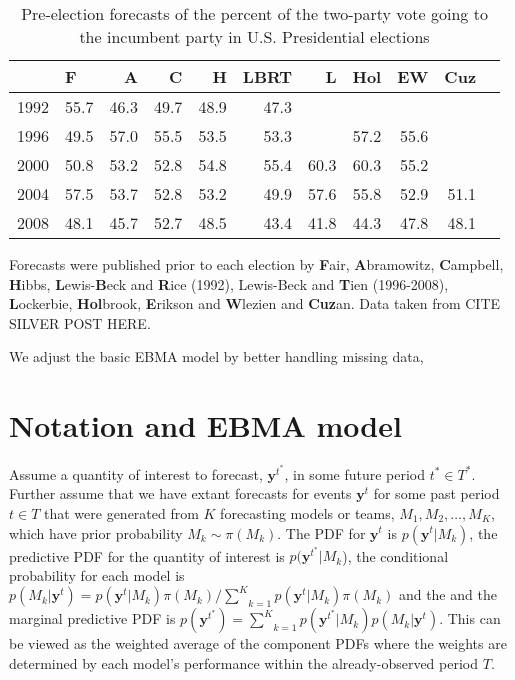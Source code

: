 \documentclass[12pt,fullpage,endnotes]{article}
\begin{document}
\begin{table}[ht]
\caption{Pre-election forecasts of the percent of the two-party vote going to the incumbent party in U.S. Presidential elections}
\footnotesize
\begin{center}
\begin{tabular}{rlrrrrrrrrr}
  \toprule
  & F & A & C & H & LBRT & L & Hol & EW & Cuz \\ 
  \midrule
  1992 & 55.7 & 46.3 & 49.7 & 48.9 & 47.3 &  &  &  &  \\ 
  1996 & 49.5 & 57.0 & 55.5 & 53.5 & 53.3 &  & 57.2 & 55.6 &  \\ 
  2000 & 50.8 & 53.2 & 52.8 & 54.8 & 55.4 & 60.3 & 60.3 & 55.2 &  \\ 
  2004 & 57.5 & 53.7 & 52.8 & 53.2 & 49.9 & 57.6 & 55.8 & 52.9 & 51.1 \\ 
  2008 & 48.1 & 45.7 & 52.7 & 48.5 & 43.4 & 41.8 & 44.3 & 47.8 & 48.1 \\ 
  \bottomrule

\end{tabular}
\end{center}
Forecasts were published prior to each election by \textbf{F}air, \textbf{A}bramowitz, \textbf{C}ampbell, \textbf{H}ibbs, \textbf{L}ewis-\textbf{B}eck and \textbf{R}ice (1992), Lewis-Beck and \textbf{T}ien  (1996-2008),   \textbf{L}ockerbie, \textbf{Hol}brook, \textbf{E}rikson and \textbf{W}lezien and \textbf{Cuz}an.  Data taken from CITE SILVER POST HERE.
\end{table}


We adjust the basic EBMA model by better handling missing data, 

\section{Notation and EBMA model} 

Assume a quantity of interest to forecast, $\mathbf{y}^{t^*}$, in some
future period $t^\ast \in T^\ast$.  Further assume that we have extant
forecasts for events $\mathbf{y}^t$ for some past period $t \in T$
that were generated from $K$ forecasting models or teams, $M_1, M_2,
\ldots, M_K$, which have prior probability $M_k\sim \pi(M_k)$. The PDF
for $\mathbf{y}^t$ is $p(\mathbf{y}^t|M_k)$, the predictive PDF for
the quantity of interest is $p(\mathbf{y}^{t^*}|M_k$), the conditional
probability for each model is $p(M_k|\mathbf{y}^t) =
p(\mathbf{y}^t|M_k)\pi(M_k)/\underset{k=1}{\overset{K}{\sum}}p(\mathbf{y}^t|M_k)\pi(M_k)$
and the and the marginal predictive PDF is $p(\mathbf{y}^{t^*}) =
\underset{k=1}{\overset{K}{\sum}}
p(\mathbf{y}^{t^*}|M_k)p(M_k|\mathbf{y}^{t})$.  This can be viewed as
the weighted average of the component PDFs where the weights are
determined by each model's performance within the already-observed
period $T$.
\end{document}
